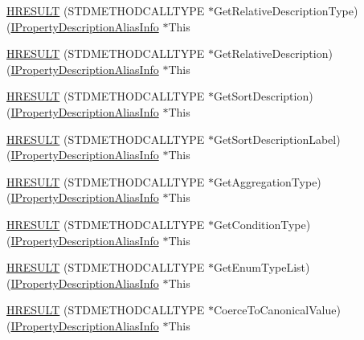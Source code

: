 \begin{DoxyCompactItemize}
\item 
\hyperlink{struct_i_property_description_alias_info_vtbl_aad16c941011c01aea07bb3c9940e4241}{H\+R\+E\+S\+U\+LT} (S\+T\+D\+M\+E\+T\+H\+O\+D\+C\+A\+L\+L\+T\+Y\+PE $\ast$Get\+Relative\+Description\+Type)(\hyperlink{propsys_8h_a340fea8f1bc0adf5146e75d71bbdf9bc}{I\+Property\+Description\+Alias\+Info} $\ast$This
\item 
\hyperlink{struct_i_property_description_alias_info_vtbl_a037aa8a934f810e6e908b43a1c50d64d}{H\+R\+E\+S\+U\+LT} (S\+T\+D\+M\+E\+T\+H\+O\+D\+C\+A\+L\+L\+T\+Y\+PE $\ast$Get\+Relative\+Description)(\hyperlink{propsys_8h_a340fea8f1bc0adf5146e75d71bbdf9bc}{I\+Property\+Description\+Alias\+Info} $\ast$This
\item 
\hyperlink{struct_i_property_description_alias_info_vtbl_a5269b26c4fe214431b0d5153756eff9e}{H\+R\+E\+S\+U\+LT} (S\+T\+D\+M\+E\+T\+H\+O\+D\+C\+A\+L\+L\+T\+Y\+PE $\ast$Get\+Sort\+Description)(\hyperlink{propsys_8h_a340fea8f1bc0adf5146e75d71bbdf9bc}{I\+Property\+Description\+Alias\+Info} $\ast$This
\item 
\hyperlink{struct_i_property_description_alias_info_vtbl_a8e9b6e7361b7a11a6caecc19a659f154}{H\+R\+E\+S\+U\+LT} (S\+T\+D\+M\+E\+T\+H\+O\+D\+C\+A\+L\+L\+T\+Y\+PE $\ast$Get\+Sort\+Description\+Label)(\hyperlink{propsys_8h_a340fea8f1bc0adf5146e75d71bbdf9bc}{I\+Property\+Description\+Alias\+Info} $\ast$This
\item 
\hyperlink{struct_i_property_description_alias_info_vtbl_a102aca3f706ea4ea05d53429a4c18f98}{H\+R\+E\+S\+U\+LT} (S\+T\+D\+M\+E\+T\+H\+O\+D\+C\+A\+L\+L\+T\+Y\+PE $\ast$Get\+Aggregation\+Type)(\hyperlink{propsys_8h_a340fea8f1bc0adf5146e75d71bbdf9bc}{I\+Property\+Description\+Alias\+Info} $\ast$This
\item 
\hyperlink{struct_i_property_description_alias_info_vtbl_a7bee3c64f962ad186c209572a6bb706b}{H\+R\+E\+S\+U\+LT} (S\+T\+D\+M\+E\+T\+H\+O\+D\+C\+A\+L\+L\+T\+Y\+PE $\ast$Get\+Condition\+Type)(\hyperlink{propsys_8h_a340fea8f1bc0adf5146e75d71bbdf9bc}{I\+Property\+Description\+Alias\+Info} $\ast$This
\item 
\hyperlink{struct_i_property_description_alias_info_vtbl_a34a9e153f3bfd0ad5c36309ab9cc8fbe}{H\+R\+E\+S\+U\+LT} (S\+T\+D\+M\+E\+T\+H\+O\+D\+C\+A\+L\+L\+T\+Y\+PE $\ast$Get\+Enum\+Type\+List)(\hyperlink{propsys_8h_a340fea8f1bc0adf5146e75d71bbdf9bc}{I\+Property\+Description\+Alias\+Info} $\ast$This
\item 
\hyperlink{struct_i_property_description_alias_info_vtbl_a7bfadf690565d4759998e4ddbdacfcc5}{H\+R\+E\+S\+U\+LT} (S\+T\+D\+M\+E\+T\+H\+O\+D\+C\+A\+L\+L\+T\+Y\+PE $\ast$Coerce\+To\+Canonical\+Value)(\hyperlink{propsys_8h_a340fea8f1bc0adf5146e75d71bbdf9bc}{I\+Property\+Description\+Alias\+Info} $\ast$This

\end{DoxyCompactItemize}
